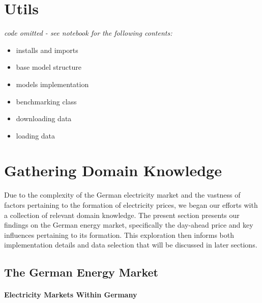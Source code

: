 \documentclass[a4paper]{article}
\providecommand{\tightlist}{%
      \setlength{\itemsep}{0pt}\setlength{\parskip}{0pt}}
\begin{document}
    \section{Utils}\label{utils}\textit{code omitted - see notebook for the following contents:}\begin{itemize}\tightlist
\item installs and imports
\item base model structure
\item models implementation
\item benchmarking class
\item downloading data
\item loading data
\end{itemize}\section{Gathering Domain
Knowledge}\label{gathering-domain-knowledge}

    Due to the complexity of the German electricity market and the vastness
of factors pertaining to the formation of electricity prices, we began
our efforts with a collection of relevant domain knowledge. The present
section presents our findings on the German energy market, specifically
the day-ahead price and key influences pertaining to its formation. This
exploration then informs both implementation details and data selection
that will be discussed in later sections.

\subsection{The German Energy Market}\label{the-german-energy-market}

\paragraph{Electricity Markets Within
Germany}\label{electricity-markets-within-germany}
\end{document}
